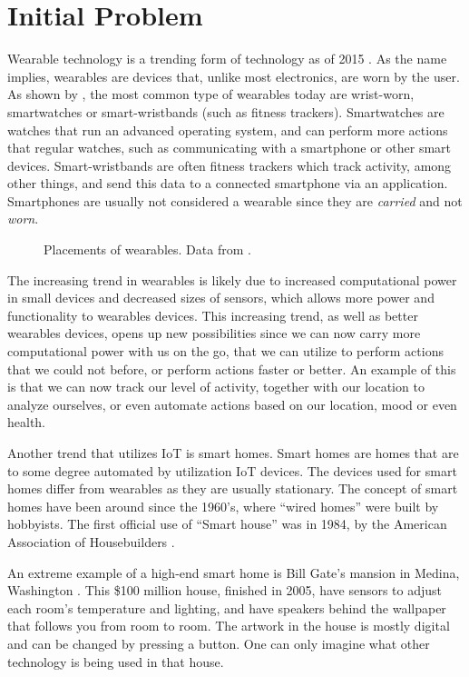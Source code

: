 \section{Initial Problem}\label{sec:initproblem}
Wearable technology is a trending form of technology as of 2015 \cite{WEARABLESTREND}. 
As the name implies, wearables are devices that, 
unlike most electronics, are worn by the user. 
As shown by , 
the most common type of wearables today are wrist-worn, 
\eg smartwatches or smart-wristbands (such as fitness trackers).
Smartwatches are watches that run an advanced operating system, 
and can perform more actions that regular watches, 
such as communicating with a smartphone or other smart devices.
Smart-wristbands are often fitness trackers which track activity, among other things, 
and send this data to a connected smartphone via an application. 
Smartphones are usually not considered a wearable since they are \emph{carried} and not \emph{worn}. 

\begin{figure}[!htb]
  \centering
  
  \caption{Placements of wearables. Data from \protect\cite{LISTOFWEARABLES}.}
  \label{fig:wearables-placement}
\end{figure}

The increasing trend in wearables is likely due to increased computational power in small devices and decreased sizes of sensors, 
which allows more power and functionality to wearables devices. 
This increasing trend, as well as better wearables devices, 
opens up new possibilities since we can now carry more computational power with us on the go, 
that we can utilize to perform actions that we could not before, 
or perform actions faster or better. 
An example of this is that we can now track our level of activity, 
together with our location to analyze ourselves, 
or even automate actions based on our location, mood or even health. 

Another trend that utilizes IoT is smart homes.
Smart homes are homes that are to some degree automated by utilization IoT devices. 
The devices used for smart homes differ from wearables as they are usually stationary. 
The concept of smart homes have been around since the 1960's, 
where ``wired homes'' were built by hobbyists. 
The first official use of ``Smart house'' was in 1984, 
by the American Association of Housebuilders \cite{harper2003}.

An extreme example of a high-end smart home is Bill Gate's mansion in Medina, Washington \cite{billgatehouse}.
This \$100 million house, finished in 2005, 
have sensors to adjust each room's temperature and lighting, 
and have speakers behind the wallpaper that follows you from room to room. 
The artwork in the house is mostly digital and can be changed by pressing a button. 
One can only imagine what other technology is being used in that house. 

